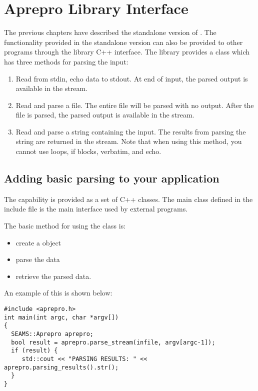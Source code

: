 \chapter{Aprepro Library Interface}

The previous chapters have described the standalone version of
\aprepro{}.  The functionality provided in the standalone version can
also be provided to other programs through the \aprepro{} library
C++ interface. The \aprepro{} library provides a 
class which has three methods for parsing the input:
\begin{enumerate}
\item Read from stdin, echo data to stdout. At end of input, the
parsed output is available in the 
stream. 
\item Read and parse a file. The entire file will be parsed with no
output.  After the file is parsed, the parsed output is available in
the  stream.
\item Read and parse a string containing the \aprepro{} input. The
results from parsing the string are returned in the 
stream. Note that when using this method, you cannot use loops, if
blocks, verbatim, and echo.
\end{enumerate}

\section{Adding basic \aprepro{} parsing to your application}
The \aprepro{} capability is provided as a set of C++ classes. The
main  class defined in the  
include file is the main interface used by external programs.

The basic method for using the  class is:
\begin{itemize}
\item create a  object
\item parse the data
\item retrieve the parsed data.
\end{itemize}
An example of this is shown below:
\begin{lstlisting}
#include <aprepro.h>
int main(int argc, char *argv[])
{
  SEAMS::Aprepro aprepro;
  bool result = aprepro.parse_stream(infile, argv[argc-1]);
  if (result) {
     std::cout << "PARSING RESULTS: " << aprepro.parsing_results().str();
  }
}
\end{lstlisting}

